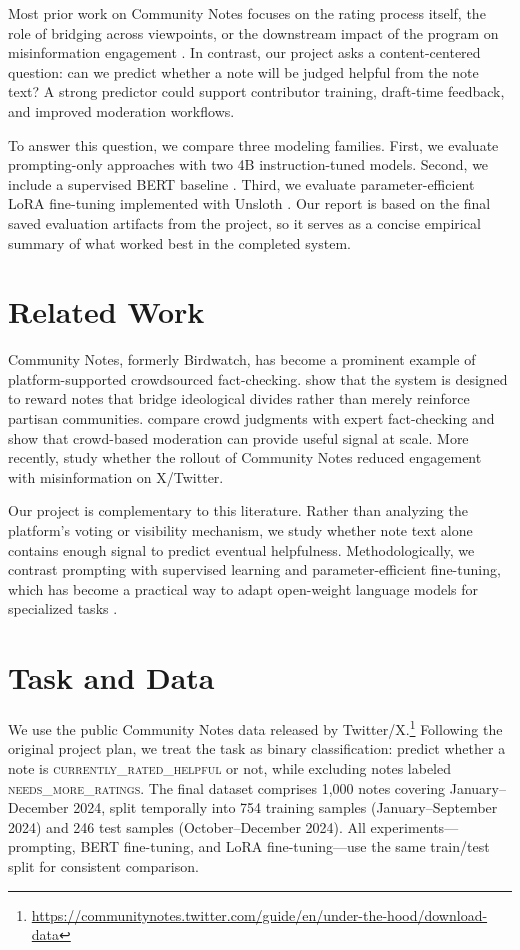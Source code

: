 \documentclass[11pt]{article}
\begin{document}
	Most prior work on Community Notes focuses on the rating process itself, the role of bridging across viewpoints, or the downstream impact of the program on misinformation engagement \citep{allen2022,chuai2024}. In contrast, our project asks a content-centered question: can we predict whether a note will be judged helpful from the note text? A strong predictor could support contributor training, draft-time feedback, and improved moderation workflows.
	
	To answer this question, we compare three modeling families. First, we evaluate prompting-only approaches with two 4B instruction-tuned models. Second, we include a supervised BERT baseline \citep{devlin2019bert}. Third, we evaluate parameter-efficient LoRA fine-tuning \citep{hu2022lora} implemented with Unsloth \citep{unsloth2024}. Our report is based on the final saved evaluation artifacts from the project, so it serves as a concise empirical summary of what worked best in the completed system.
	
	\section{Related Work}
	Community Notes, formerly Birdwatch, has become a prominent example of platform-supported crowdsourced fact-checking. \citet{allen2022} show that the system is designed to reward notes that bridge ideological divides rather than merely reinforce partisan communities. \citet{saeed2022} compare crowd judgments with expert fact-checking and show that crowd-based moderation can provide useful signal at scale. More recently, \citet{chuai2024} study whether the rollout of Community Notes reduced engagement with misinformation on X/Twitter.
	
	Our project is complementary to this literature. Rather than analyzing the platform's voting or visibility mechanism, we study whether note text alone contains enough signal to predict eventual helpfulness. Methodologically, we contrast prompting with supervised learning and parameter-efficient fine-tuning, which has become a practical way to adapt open-weight language models for specialized tasks \citep{hu2022lora}.
	
	\section{Task and Data}
	We use the public Community Notes data released by Twitter/X.\footnote{\begin{minipage}{\columnwidth}\small\url{https://communitynotes.twitter.com/guide/en/under-the-hood/download-data}\end{minipage}} Following the original project plan, we treat the task as binary classification: predict whether a note is \textsc{currently\_rated\_helpful} or not, while excluding notes labeled \textsc{needs\_more\_ratings}. The final dataset comprises 1,000 notes covering January--December 2024, split temporally into 754 training samples (January--September 2024) and 246 test samples (October--December 2024). All experiments---prompting, BERT fine-tuning, and LoRA fine-tuning---use the same train/test split for consistent comparison.
	
\end{document}
